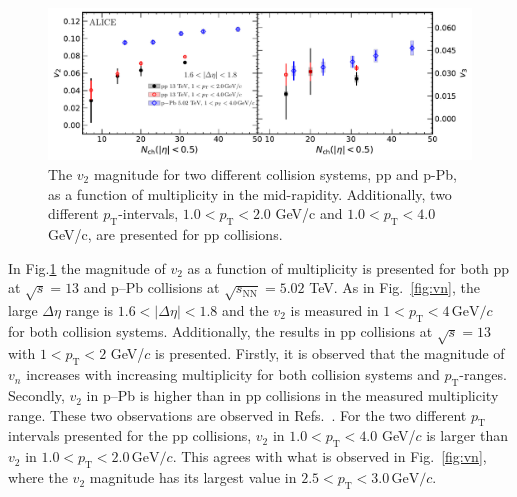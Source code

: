 \begin{figure}[h!]
	\centering
	\includegraphics[width=1.0\textwidth]{figures/Fig6_v2Mult_allSystems_Data.pdf} 
	\caption{The $v_2$ magnitude for two different collision systems, pp and p-Pb, as a function of multiplicity in the mid-rapidity. Additionally, two different $p_\mathrm{T}$-intervals, $1.0<p_\mathrm{T}<2.0$ GeV/c and $1.0<p_\mathrm{T}<4.0$ GeV/c, are presented for pp collisions.} 
	\label{fig:v2mult}
\end{figure}

In Fig.\ref{fig:v2mult} the magnitude of $v_2$ as a function of multiplicity is presented for both pp at $\sqrt{s}=13$ and p--Pb collisions at $\sqrt{s_\mathrm{NN}}=5.02$ TeV. As in Fig.~\ref{fig:vn}, the large $\Delta\eta$ range is $1.6<|\Delta\eta|<1.8$ and the $v_2$ is measured in $1<p_{\mathrm{T}}<4\,\mathrm{GeV}/c$ for both collision systems. Additionally, the results in pp collisions at $\sqrt{s}=13$ with $1<p_{\mathrm{T}}<2$ GeV/$c$ is presented. Firstly, it is observed that the magnitude of $v_n$ increases with increasing multiplicity for both collision systems and $p_\mathrm{T}$-ranges. Secondly, $v_2$ in p--Pb is higher than in pp collisions in the measured multiplicity range. These two observations are observed in Refs.~\cite{ATLAS:2015hzw,ATLAS:2016yzd, Khachatryan:2015lva}. 
For the two different $p_\mathrm{T}$ intervals presented for the pp collisions, $v_2$ in $1.0<p_\mathrm{T}<4.0$ GeV/$c$ is larger than $v_2$ in $1.0<p_\mathrm{T}<2.0\,\mathrm{GeV}/c$. %
This agrees with what is observed in Fig.~\ref{fig:vn}, where the $v_2$ magnitude has its largest value in $2.5<p_\mathrm{T}<3.0\,\mathrm{GeV}/c$.


